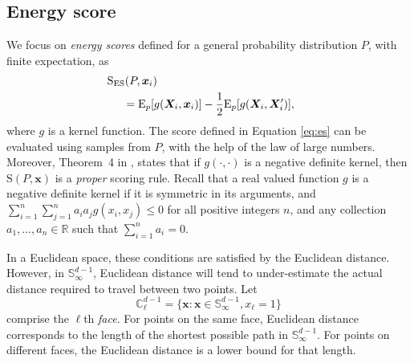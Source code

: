 \subsection{Energy score}
We focus on \emph{energy scores} defined for a general probability distribution $P$, with finite expectation, as 
    \begin{equation}
    \label{eq:es}
    \begin{aligned}
    &\hspace{-0.5cm}\text{S}_{\text{ES}}\left(P, \bm{x}_i\right) \\
    &=\text{E}_p \left[g\left(\bm{X}_i, \bm{x}_i\right)\right] -
                                    \frac{1}{2}\text{E}_p \left[g\left(\bm{X}_i,\bm{X}_i^{\prime}\right)\right],
    \end{aligned}
    \end{equation}
where $g$ is a kernel function. The score defined in Equation \eqref{eq:es} can be evaluated
  using samples from $P$, with the help of the law of large numbers.
  Moreover, Theorem~4 in \cite{gneiting2007}, states that if $g(\cdot,\cdot)$ is a negative 
  definite kernel, then $\text{S}(P,\bm{x})$ is a \emph{proper} scoring rule.  Recall that a 
  real valued function $g$ is a negative definite kernel if it is symmetric in its arguments, 
  and $\sum_{i=1}^n\sum_{j=1}^na_ia_jg(x_i,x_j)\leq 0$ for all positive integers $n$, and any 
  collection $a_1,\ldots,a_n\in{\mathbb R}$ such that  $\sum_{i = 1}^na_i = 0$.  

In a Euclidean space, these conditions are satisfied by the Euclidean distance. However, in
  ${\mathbb S}_{\infty}^{d-1}$, Euclidean distance will tend to under-estimate the actual 
  distance required to travel between two points.  Let
\begin{equation*}
    {\mathbb C}_{\ell}^{d-1} = \lbrace \bm{x} : \bm{x} \in {\mathbb S}_{\infty}^{d-1}, x_{\ell} = 1\rbrace
\end{equation*}
comprise the $\ell$th \emph{face}.  For points on the same face, Euclidean distance 
  corresponds to the length of the shortest possible path in ${\mathbb S}_{\infty}^{d-1}$.  
  For points on different faces, the Euclidean distance is a lower bound for that length.

